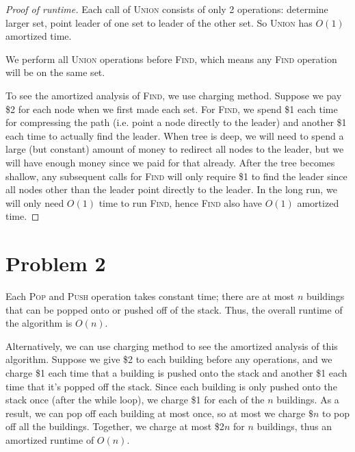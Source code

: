 \documentclass{article}
\begin{document}
\begin{proof}[Proof of runtime]
Each call of \textsc{Union} consists of only 2 operations: determine larger set, point leader of one set to leader of the other set. So \textsc{Union} has $O(1)$ amortized time.

We perform all \textsc{Union} operations before \textsc{Find}, which means any \textsc{Find} operation will be on the same set.

To see the amortized analysis of \textsc{Find}, we use charging method. Suppose we pay \$2 for each node when we first made each set. For \textsc{Find}, we spend \$1 each time for compressing the path (i.e. point a node directly to the leader) and another \$1 each time to actually find the leader. When tree is deep, we will need to spend a large (but constant) amount of money to redirect all nodes to the leader, but we will have enough money since we paid for that already. After the tree becomes shallow, any subsequent calls for \textsc{Find} will only require \$1 to find the leader since all nodes other than the leader point directly to the leader. In the long run, we will only need $O(1)$ time to run \textsc{Find}, hence \textsc{Find} also have $O(1)$ amortized time.
\end{proof}


\section*{Problem 2}
Each \textsc{Pop} and \textsc{Push} operation takes constant time; there are at most $n$ buildings that can be popped onto or pushed off of the stack. Thus, the overall runtime of the algorithm is $O(n)$.

Alternatively, we can use charging method to see the amortized analysis of this algorithm. Suppose we give \$2 to each building before any operations, and we charge \$1 each time that a building is pushed onto the stack and another \$1 each time that it's popped off the stack. Since each building is only pushed onto the stack once (after the while loop), we charge \$1 for each of the $n$ buildings. As a result, we can pop off each building at most once, so at most we charge $\$n$ to pop off all the buildings. Together, we charge at most \$2$n$ for $n$ buildings, thus an amortized runtime of $O(n)$.
\end{document}
